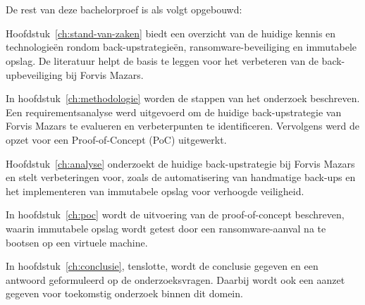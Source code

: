 \section{}%
\label{sec:opzet-bachelorproef}


De rest van deze bachelorproef is als volgt opgebouwd:

Hoofdstuk~\ref{ch:stand-van-zaken} biedt een overzicht van de huidige kennis en technologieën rondom back-upstrategieën, ransomware-beveiliging en immutabele opslag. De literatuur helpt de basis te leggen voor het verbeteren van de back-upbeveiliging bij Forvis Mazars.

In hoofdstuk~\ref{ch:methodologie} worden de stappen van het onderzoek beschreven. Een requirementsanalyse werd uitgevoerd om de huidige back-upstrategie van Forvis Mazars te evalueren en verbeterpunten te identificeren. Vervolgens werd de opzet voor een Proof-of-Concept (PoC) uitgewerkt.

Hoofdstuk~\ref{ch:analyse} onderzoekt de huidige back-upstrategie bij Forvis Mazars en stelt verbeteringen voor, zoals de automatisering van handmatige back-ups en het implementeren van immutabele opslag voor verhoogde veiligheid.

In hoofdstuk~\ref{ch:poc} wordt de uitvoering van de proof-of-concept beschreven, waarin immutabele opslag wordt getest door een ransomware-aanval na te bootsen op een virtuele machine.

In hoofdstuk~\ref{ch:conclusie}, tenslotte, wordt de conclusie gegeven en een antwoord geformuleerd op de onderzoeksvragen. Daarbij wordt ook een aanzet gegeven voor toekomstig onderzoek binnen dit domein.